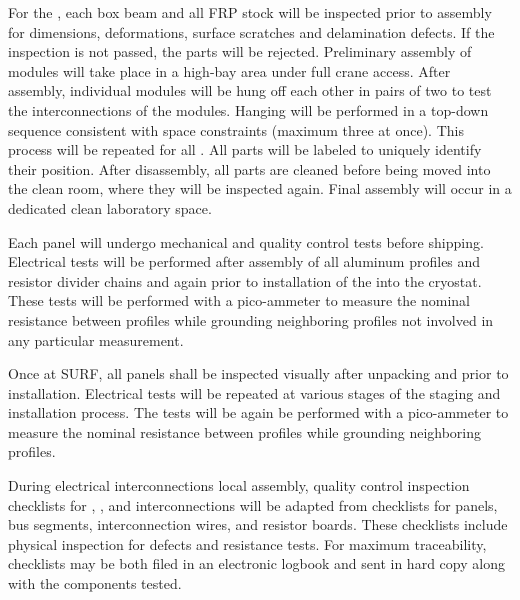 For the , each box beam and all FRP stock will be inspected prior to assembly for dimensions, deformations, surface scratches and delamination defects. If the inspection is not passed, the parts will be rejected.
Preliminary assembly of  modules will take place in a high-bay area under full crane access. After assembly, individual  modules will be hung off each other in pairs of two to test the interconnections of the modules. Hanging will be performed in a top-down sequence consistent with space constraints (maximum three at once). This process will be repeated for all . All parts will be labeled to uniquely identify their position. After disassembly, all parts are cleaned before being moved into the clean room, where they will be inspected again. Final assembly will occur in a dedicated clean laboratory space.

Each panel will undergo mechanical and quality control tests  before shipping. 
 Electrical  tests will be performed after assembly of all aluminum profiles and resistor divider chains and again prior to installation of the  into the cryostat. These tests will be performed with a pico-ammeter to measure the nominal resistance between profiles while grounding neighboring profiles not involved in any particular measurement.



Once at SURF, all  panels shall be inspected visually after unpacking and prior to installation. Electrical tests will be repeated at various stages of the staging and installation process.
The tests will be again be performed with a pico-ammeter to measure the nominal resistance between profiles while grounding neighboring profiles.

During electrical interconnections local assembly, quality control inspection checklists for , , and
interconnections will be adapted from  checklists for 
panels,  bus segments, interconnection wires, and resistor boards.
These checklists include physical inspection for defects and
resistance tests.  For maximum traceability, checklists may be both
filed in an electronic logbook and sent in hard copy along with the
components tested.

